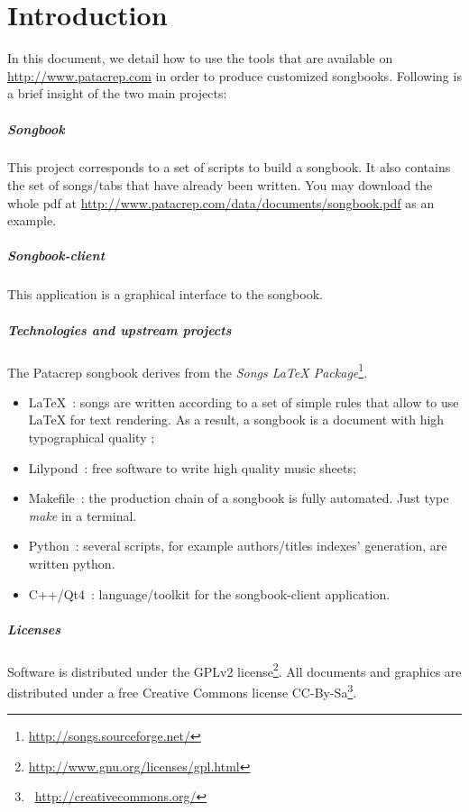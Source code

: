 \chapter*{Introduction}
\minitoc
\label{chap:introduction}

In this document, we detail how to use the tools that are available on
\url{http://www.patacrep.com} in order to produce customized
songbooks. Following is a brief insight of the two main projects:

\paragraph{Songbook}
This project corresponds to a set of scripts to build a songbook.  It
also contains the set of songs/tabs that have already been written.
You may download the whole pdf at
\url{http://www.patacrep.com/data/documents/songbook.pdf} as an
example.

\paragraph{Songbook-client} 
This application is a graphical interface to the songbook.

\paragraph{Technologies and upstream projects} 
The Patacrep songbook derives from the \emph{Songs LaTeX
  Package}\footnote{\url{http://songs.sourceforge.net/}}.

\begin{itemize}
\item \LaTeX~: songs are written according to a set of simple rules
  that allow to use \LaTeX{} for text rendering. As a result, a songbook
  is a document with high typographical quality ;
\item Lilypond~: free software to write high quality music sheets;
\item Makefile~: the production chain of a songbook is fully
  automated. Just type \emph{make} in a terminal.
\item Python~: several scripts, for example authors/titles indexes'
  generation, are written python.
\item C++/Qt4~: language/toolkit for the songbook-client application.
\end{itemize}

\paragraph{Licenses}
Software is distributed under the GPLv2
license\footnote{\url{http://www.gnu.org/licenses/gpl.html}}. All
documents and graphics are distributed under a free Creative Commons
license CC-By-Sa\footnote{\bysa~\url{http://creativecommons.org/}}.
